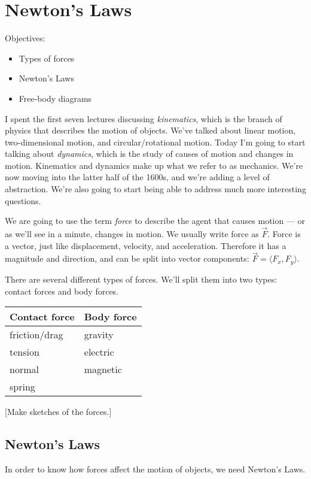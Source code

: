\section{Newton's Laws}
Objectives:
\begin{itemize}
\item Types of forces
\item Newton's Laws
\item Free-body diagrams
\end{itemize}
\hrulefill

I spent the first seven lectures discussing \textit{kinematics}, which is the branch of physics that describes the motion of objects. We've talked about linear motion, two-dimensional motion, and circular/rotational motion. Today I'm going to start talking about \textit{dynamics}, which is the study of causes of motion and changes in motion. Kinematics and dynamics make up what we refer to as mechanics. We're now moving into the latter half of the 1600s, and we're adding a level of abstraction. We're also going to start being able to address much more interesting questions.

We are going to use the term \textit{force} to describe the agent that causes motion --- or as we'll see in a minute, changes in motion. We usually write force as $\vec{F}$. Force is a vector, just like displacement, velocity, and acceleration. Therefore it has a magnitude and direction, and can be split into vector components: $\vec{F}=\langle{F_x,F_y}\rangle$.

There are several different types of forces. We'll split them into two types: contact forces and body forces.

\begin{table}[h]
\begin{tabular}{ll}
Contact force & Body force\\
\hline
friction/drag & gravity\\
tension & electric\\
normal & magnetic\\
spring & \\
\hline
\end{tabular}
\end{table}

[Make sketches of the forces.]
\clearpage


\subsection{Newton's Laws}
In order to know how forces affect the motion of objects, we need Newton's Laws.

